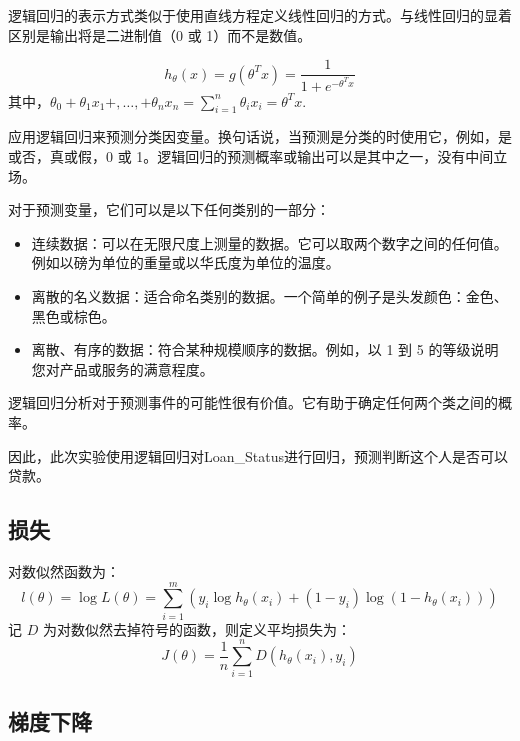 \documentclass[UTF8,a4paper,AutoFakeBold,AutoFakeSlant]{article}
\begin{document}
逻辑回归的表示方式类似于使用直线方程定义线性回归的方式。与线性回归的显着区别是输出将是二进制值（0 或 1）而不是数值。

\begin{equation}
  h_{\theta}(x)=g\left(\theta^{T} x\right)=\frac{1}{1+e^{-\theta^{T} x}}
  \label{eq1}
\end{equation}
其中，$\theta_{0}+\theta_{1} x_{1}+, \ldots,+\theta_{n} x_{n}=\sum_{i=1}^{n} \theta_{i} x_{i}=\theta^{T} x$.

应用逻辑回归来预测分类因变量。换句话说，当预测是分类的时使用它，例如，是或否，真或假，0 或 1。逻辑回归的预测概率或输出可以是其中之一，没有中间立场。

对于预测变量，它们可以是以下任何类别的一部分：

\begin{itemize}
  \item 连续数据：可以在无限尺度上测量的数据。它可以取两个数字之间的任何值。例如以磅为单位的重量或以华氏度为单位的温度。
  \item 离散的名义数据：适合命名类别的数据。一个简单的例子是头发颜色：金色、黑色或棕色。
  \item 离散、有序的数据：符合某种规模顺序的数据。例如，以 1 到 5 的等级说明您对产品或服务的满意程度。
\end{itemize}

逻辑回归分析对于预测事件的可能性很有价值。它有助于确定任何两个类之间的概率。

因此，此次实验使用逻辑回归对Loan\_Status进行回归，预测判断这个人是否可以贷款。


\subsection{损失}

对数似然函数为：
\begin{equation*}
  l(\theta)=\log L(\theta)=\sum_{i=1}^{m}\left(y_{i} \log h_{\theta}\left(x_{i}\right)+\left(1-y_{i}\right) \log \left(1-h_{\theta}\left(x_{i}\right)\right)\right)
\end{equation*}
记 $D$ 为对数似然去掉符号的函数，则定义平均损失为：
\begin{equation*}
  J(\theta)=\frac{1}{n} \sum_{i=1}^{n} D\left(h_{\theta}\left(x_{i}\right), y_{i}\right)
\end{equation*}


\subsection{梯度下降}
\end{document}
